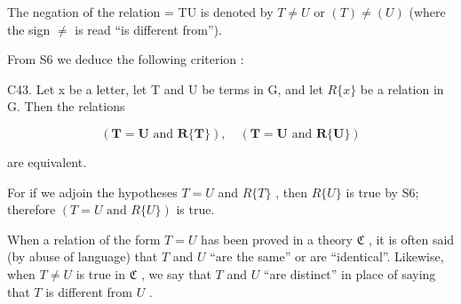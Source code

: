 The negation of the relation = TU is denoted by \(T \neq U\) or \((T) \neq (U)\) (where the sign \(\neq\) is read ``is different from'').

From S6 we deduce the following criterion :

C43. Let x be a letter, let T and U be terms in G, and let \(R\{x\}\) be a relation in G. Then the relations

\[
(\boldsymbol {T} = \boldsymbol {U} \text {   and   } \boldsymbol {R} \{\boldsymbol {T} \}), \quad (\boldsymbol {T} = \boldsymbol {U} \text {   and   } \boldsymbol {R} \{\boldsymbol {U} \})
\]

are equivalent.

For if we adjoin the hypotheses \(T = U\) and \(R\{T\}\) , then \(R\{U\}\) is true by S6; therefore \((T = U \text{ and } R\{U\})\) is true.

When a relation of the form \(T = U\) has been proved in a theory \(\mathfrak{C}\) , it is often said (by abuse of language) that \(T\) and \(U\) ``are the same'' or are ``identical''. Likewise, when \(T \neq U\) is true in \(\mathfrak{C}\) , we say that \(T\) and \(U\) ``are distinct'' in place of saying that \(T\) is different from \(U\) .

